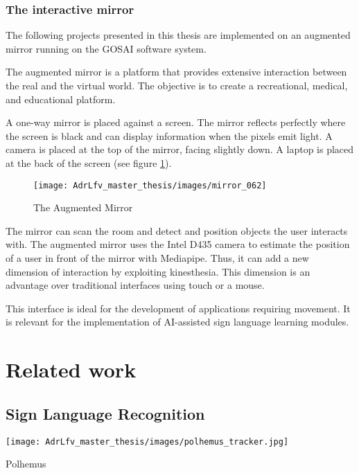 \subsubsection{The interactive mirror}

The following projects presented in this thesis are implemented on an augmented mirror running on the GOSAI software system.

The augmented mirror is a platform that provides extensive interaction between the real and the virtual world. The objective is to create a recreational, medical, and educational platform.

A one-way mirror is placed against a screen. The mirror reflects perfectly where the screen is black and can display information when the pixels emit light. A camera is placed at the top of the mirror, facing slightly down. A laptop is placed at the back of the screen (see figure \ref{fig:mirror_062}).

\begin{figure}[h]
    \centering
    \texttt{[image: AdrLfv\_master\_thesis/images/mirror\_062]}
    \caption{The Augmented Mirror}
    \label{fig:mirror_062}
\end{figure}


The mirror can scan the room and detect and position objects the user interacts with. The augmented mirror uses the Intel D435 camera to estimate the position of a user in front of the mirror with Mediapipe. Thus, it can add a new dimension of interaction by exploiting kinesthesia. This dimension is an advantage over traditional interfaces using touch or a mouse. 

This interface is ideal for the development of applications requiring movement. It is relevant for the implementation of AI-assisted sign language learning modules.

\section{Related work}

\subsection{Sign Language Recognition}

\begin{marginfigure}
    \centering
    \texttt{[image: AdrLfv\_master\_thesis/images/polhemus\_tracker.jpg]}
    \caption{Polhemus}
    \label{fig:Polhemus}
\end{marginfigure}

